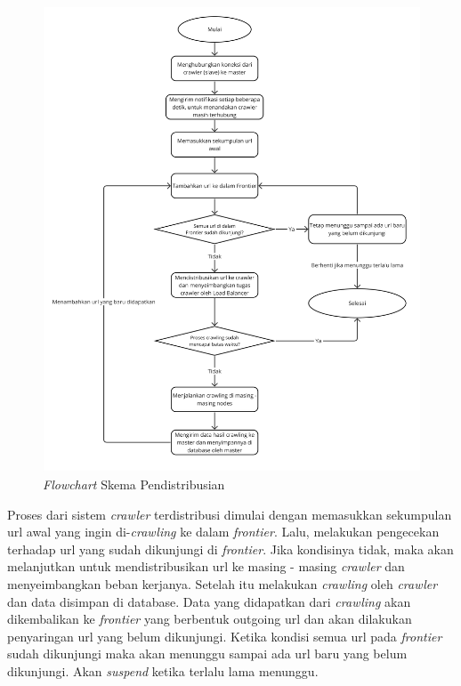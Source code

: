 \begin{figure}[H]
  \centering{}
	\includegraphics[width=1\textwidth]{gambar/flowchart_distributed_crawler}
  \caption{\emph{Flowchart} Skema Pendistribusian}
\end{figure}

Proses dari sistem \emph{crawler} terdistribusi dimulai dengan memasukkan sekumpulan url awal yang ingin di-\emph{crawling} ke dalam \emph{frontier}. Lalu, melakukan pengecekan terhadap url yang sudah dikunjungi di \emph{frontier}. Jika kondisinya tidak, maka akan melanjutkan untuk mendistribusikan url ke masing - masing \emph{crawler} dan menyeimbangkan beban kerjanya. Setelah itu melakukan \emph{crawling} oleh \emph{crawler} dan data disimpan di database. Data yang didapatkan dari \emph{crawling} akan dikembalikan ke \emph{frontier} yang berbentuk outgoing url dan akan dilakukan penyaringan url yang belum dikunjungi. Ketika kondisi semua url pada \emph{frontier} sudah dikunjungi maka akan menunggu sampai ada url baru yang belum dikunjungi. Akan \emph{suspend} ketika terlalu lama menunggu.

